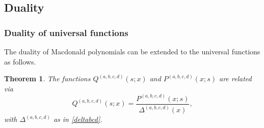 \documentclass[12pt]{amsart}
\newtheorem{thm}{Theorem}[section]
\numberwithin{equation}{section}
\begin{document}
%

%
%
%
%
%
%
%
%

\subsection{Duality}\label{sec:52}

\subsubsection{Duality of universal functions}

The duality of Macdonald polynomials can be extended to the universal functions as follows.



\begin{thm}\label{UKconj}
The functions $Q^{(a,b,c,d)}(s;x)$ and $P^{(a,b,c,d)}(x;s)$ 
%
%
are related via
\begin{equation} \label{DUoneabcd}
Q^{(a,b,c,d)}(s;x)=\frac{P^{(a,b,c,d)}(x;s)}{\Delta^{(a,b,c,d)}(x)},
\end{equation}
with $\Delta^{(a,b,c,d)}$ as in \eqref{deltabcd}.
\end{thm}
\end{document}
